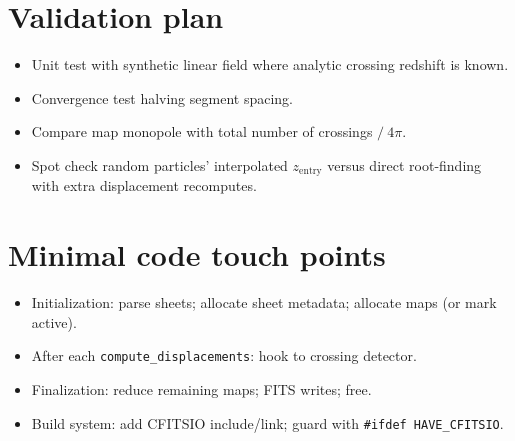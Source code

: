 \documentclass[11pt]{article}
\begin{document}
\section{Validation plan}
\begin{itemize}
  \item Unit test with synthetic linear field where analytic crossing redshift is known.
  \item Convergence test halving segment spacing.
  \item Compare map monopole with total number of crossings \(/\ 4\pi\).
  \item Spot check random particles' interpolated \(z_{\mathrm{entry}}\) versus direct root-finding with extra displacement recomputes.
\end{itemize}

\section{Minimal code touch points}
\begin{itemize}
  \item Initialization: parse sheets; allocate sheet metadata; allocate maps (or mark active).
  \item After each \verb|compute_displacements|: hook to crossing detector.
  \item Finalization: reduce remaining maps; FITS writes; free.
  \item Build system: add CFITSIO include/link; guard with \verb|#ifdef HAVE_CFITSIO|.
\end{itemize}
\end{document}
